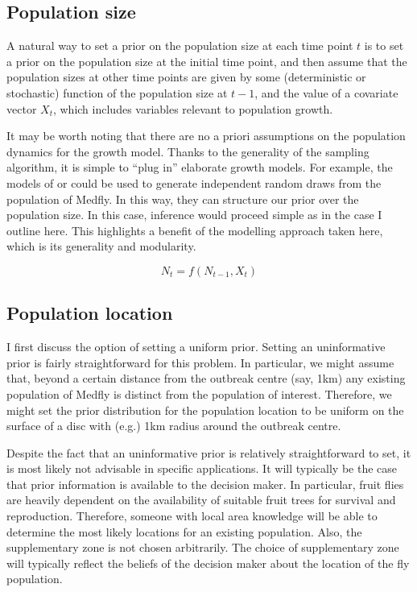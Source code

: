 \documentclass[
]{book}
\begin{document}
\hypertarget{population-size}{%
\subsection{Population size}\label{population-size}}

A natural way to set a prior on the population size at each time point \(t\) is to set a prior on the population size at the initial time point, and then assume that the population sizes at other time points are given by some (deterministic or stochastic) function of the population size at \(t-1\), and the value of a covariate vector \(X_t\), which includes variables relevant to population growth.

It may be worth noting that there are no a priori assumptions on the population dynamics for the growth model. Thanks to the generality of the sampling algorithm, it is simple to ``plug in'' elaborate growth models. For example, the models of \citet{lux2018} or \citet{manoukis2014} could be used to generate independent random draws from the population of Medfly. In this way, they can structure our prior over the population size. In this case, inference would proceed simple as in the case I outline here. This highlights a benefit of the modelling approach taken here, which is its generality and modularity.

\[
N_t = f(N_{t-1}, X_t)
\]

\hypertarget{population-location}{%
\subsection{Population location}\label{population-location}}

I first discuss the option of setting a uniform prior. Setting an uninformative prior is fairly straightforward for this problem. In particular, we might assume that, beyond a certain distance from the outbreak centre (say, 1km) any existing population of Medfly is distinct from the population of interest. Therefore, we might set the prior distribution for the population location to be uniform on the surface of a disc with (e.g.) 1km radius around the outbreak centre.

Despite the fact that an uninformative prior is relatively straightforward to set, it is most likely not advisable in specific applications. It will typically be the case that prior information is available to the decision maker. In particular, fruit flies are heavily dependent on the availability of suitable fruit trees for survival and reproduction. Therefore, someone with local area knowledge will be able to determine the most likely locations for an existing population. Also, the supplementary zone is not chosen arbitrarily. The choice of supplementary zone will typically reflect the beliefs of the decision maker about the location of the fly population.
\end{document}
